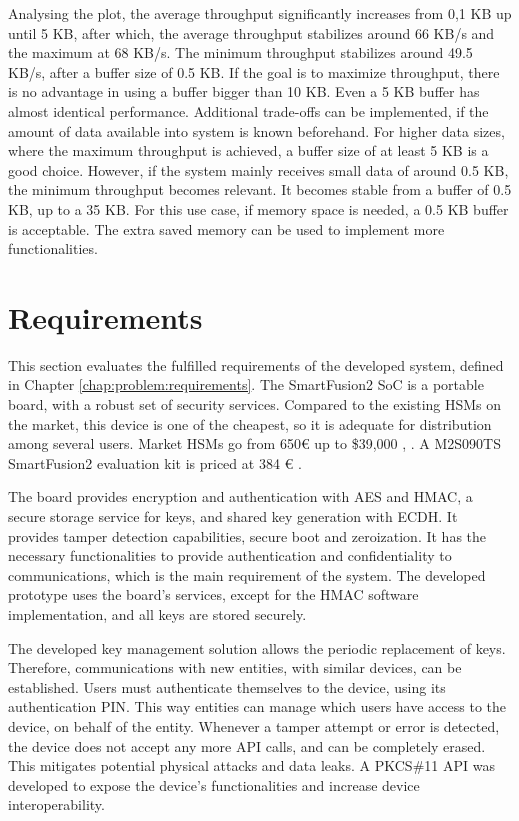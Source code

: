 Analysing the plot, the average throughput significantly increases from 0,1 KB up until 5 KB, after which, the average throughput stabilizes around 66 KB/s and the maximum at 68 KB/s. The minimum throughput stabilizes around 49.5 KB/s, after a buffer size of 0.5 KB. If the goal is to maximize throughput, there is no advantage in using a buffer bigger than 10 KB. Even a 5 KB buffer has almost identical performance. Additional trade-offs can be implemented, if the amount of data available into system is known beforehand. For higher data sizes, where the maximum throughput is achieved, a buffer size of at least 5 KB is a good choice. However, if the system mainly receives small data of around 0.5 KB, the minimum throughput becomes relevant. It becomes stable from a buffer of 0.5 KB, up to a 35 KB. For this use case, if memory space is needed, a 0.5 KB buffer is acceptable. The extra saved memory can be used to implement more functionalities.

\section{Requirements}\label{chap:evaluation:requirements}

This section evaluates the fulfilled requirements of the developed system, defined in Chapter \ref{chap:problem:requirements}.
The SmartFusion2 SoC is a portable board, with a robust set of security services.
Compared to the existing HSMs on the market, this device is one of the cheapest, so it is adequate for distribution among several users. Market HSMs go from 650€ up to \$39,000 \cite{HSMpriceArticles}, \cite{HSMPresentationPrices}. A M2S090TS SmartFusion2 evaluation kit is priced at 384 € \cite{smartfusionPrice}.

The board provides encryption and authentication with AES and HMAC, a secure storage service for keys, and shared key generation with ECDH. It provides tamper detection capabilities, secure boot and zeroization.
It has the necessary functionalities to provide authentication and confidentiality to communications, which is the main requirement of the system.
The developed prototype uses the board's services, except for the HMAC software implementation, and all keys are stored securely.

The developed key management solution allows the periodic replacement of keys. Therefore, communications with new entities, with similar devices, can be established.
Users must authenticate themselves to the device, using its authentication PIN. This way entities can manage which users have access to the device, on behalf of the entity.
Whenever a tamper attempt or error is detected, the device does not accept any more API calls, and can be completely erased. This mitigates potential physical attacks and data leaks.
A PKCS\#11 API was developed to expose the device's functionalities and increase device interoperability.

